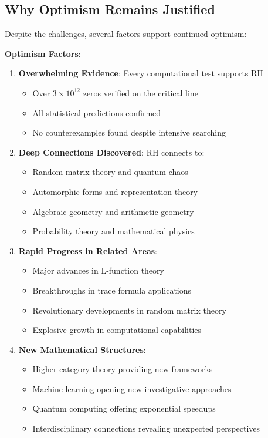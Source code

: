 \subsection{Why Optimism Remains Justified}
\label{subsec:justified_optimism}

Despite the challenges, several factors support continued optimism:

\noindent\textbf{Optimism Factors}:
\begin{enumerate}
\item \textbf{Overwhelming Evidence}: Every computational test supports RH
\begin{itemize}
\item Over $3 \times 10^{12}$ zeros verified on the critical line
\item All statistical predictions confirmed
\item No counterexamples found despite intensive searching
\end{itemize}

\item \textbf{Deep Connections Discovered}: RH connects to:
\begin{itemize}
\item Random matrix theory and quantum chaos
\item Automorphic forms and representation theory
\item Algebraic geometry and arithmetic geometry
\item Probability theory and mathematical physics
\end{itemize}

\item \textbf{Rapid Progress in Related Areas}:
\begin{itemize}
\item Major advances in L-function theory
\item Breakthroughs in trace formula applications
\item Revolutionary developments in random matrix theory
\item Explosive growth in computational capabilities
\end{itemize}

\item \textbf{New Mathematical Structures}: 
\begin{itemize}
\item Higher category theory providing new frameworks
\item Machine learning opening new investigative approaches
\item Quantum computing offering exponential speedups
\item Interdisciplinary connections revealing unexpected perspectives
\end{itemize}
\end{enumerate}

